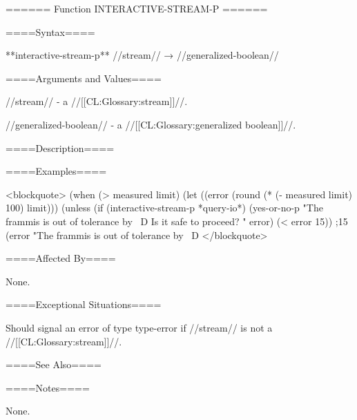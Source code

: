 ====== Function INTERACTIVE-STREAM-P ======

====Syntax====

**interactive-stream-p** //stream// → //generalized-boolean//

====Arguments and Values====

//stream// - a //[[CL:Glossary:stream]]//.

//generalized-boolean// - a //[[CL:Glossary:generalized boolean]]//.

====Description====


====Examples====

<blockquote> (when (> measured limit) (let ((error (round (* (- measured limit) 100) limit))) (unless (if (interactive-stream-p *query-io*) (yes-or-no-p "The frammis is out of tolerance by ~D Is it safe to proceed? " error) (< error 15)) ;15 (error "The frammis is out of tolerance by ~D </blockquote>

====Affected By====

None.

====Exceptional Situations====

Should signal an error of type type-error if //stream// is not a //[[CL:Glossary:stream]]//.

====See Also====

{\secref\StreamConcepts}

====Notes====

None.

